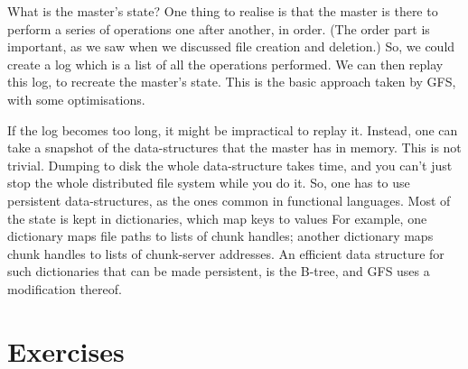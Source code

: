 What is the master's state?
One thing to realise is that the master is there to perform a series of operations
  one after another, in order.
(The order part is important, as we saw when we discussed file creation and deletion.)
So, we could create a log which is a list of all the operations performed.
We can then replay this log, to recreate the master's state.
This is the basic approach taken by GFS, with some optimisations.

If the log becomes too long, it might be impractical to replay it.
Instead,
  one can take a snapshot of the data-structures that the master has in memory.
This is not trivial.
Dumping to disk the whole data-structure takes time,
  and you can't just stop the whole distributed file system while you do it.
So, one has to use persistent data-structures,
  as the ones common in functional languages.
Most of the state is kept in dictionaries, which map keys to values
For example,
  one dictionary maps file paths to lists of chunk handles;
  another dictionary maps chunk handles to lists of chunk-server addresses.
An efficient data structure for such dictionaries that can be made persistent,
  is the B-tree,
  and GFS uses a modification thereof.


\section*{Exercises}

